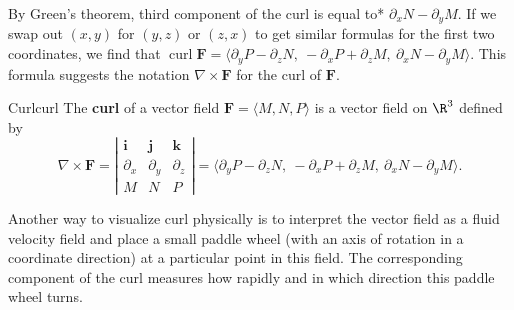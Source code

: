 \documentclass[indent]{watsonbook}
\begin{document}
By Green's theorem, third component of the curl is equal to*  $\partial_x N - \partial_yM$.  If we swap out $(x,y)$ for $(y,z)$ or $(z,x)$ to get similar formulas for the first two coordinates, we find that $\operatorname{curl} \mathbf{F} = \big\langle \partial_y P - \partial_z N, \:
-\partial_x P  + \partial_z M, \:
\partial_x N - \partial_y M \big\rangle$. This formula suggests the notation $\nabla \times \mathbf{F}$ for the curl of $\mathbf{F}$.

\begin{defn}{Curl}{curl}
  The \textbf{curl} of a vector field $\mathbf{F} = \langle M, N, P \rangle$ is
  a vector field on $\R^3$ defined by \renewcommand\arraystretch{1.4}
  \[
    \nabla \times \mathbf{F} =
    \left|
      \begin{array}{ccc}
        \mathbf{i} & \mathbf{j} & \mathbf{k} \\
        \partial_x  & \partial_y & \partial_z \\
        M         &       N       &      P
      \end{array}
    \right| = \big\langle \partial_y P - \partial_z N, \:
    -\partial_x P  + \partial_z M, \:
    \partial_x N - \partial_y M \big\rangle.
  \]
\end{defn}

\enlargethispage{10mm}

Another way to visualize curl physically is to interpret the vector field
as a fluid velocity field and place a small paddle wheel (with an
axis of rotation in a coordinate direction) at a particular
point in this field. The corresponding component of the curl measures
how rapidly and in which direction this paddle wheel turns.
\end{document}
